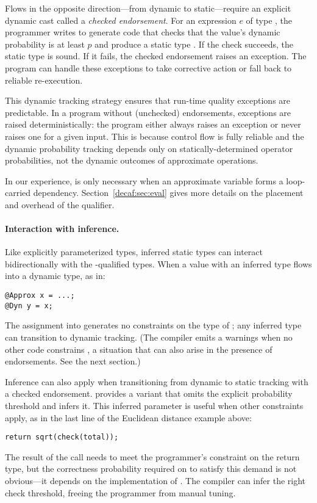 {Flows in the opposite direction---from dynamic to static---require an explicit
dynamic cast called a \emph{checked endorsement}.
For an expression $e$ of type , the programmer writes
 to generate code that checks that the value's
dynamic probability is at least $p$ and produce a static type
.
If the check succeeds, the static type is sound.
If it fails, the checked endorsement raises an exception.
The program can handle these exceptions to take corrective action or fall back
to reliable re-execution.

This dynamic tracking strategy ensures that run-time quality exceptions are predictable.
In a program without (unchecked) endorsements, exceptions are raised
deterministically: the program either always raises an exception or never
raises one for a given input.
This is because control flow is fully reliable and the dynamic probability
tracking depends only on statically-determined operator probabilities, not the
dynamic outcomes of approximate operations.

In our experience,  is only necessary when an approximate variable
forms a loop-carried dependency.
Section~\ref{decaf:sec:eval} gives more details on the placement and overhead of the
 qualifier.

\paragraph{Interaction with inference.}
Like explicitly parameterized types, inferred static types can interact bidirectionally
with the -qualified types.
When a value with an inferred type flows into a dynamic type, as in:
%
\begin{lstlisting}
@Approx x = ...;
@Dyn y = x;
\end{lstlisting}
%
The assignment into  generates no constraints on the type of ;
any inferred type can transition to dynamic tracking.
(The compiler emits a warnings when no other code constrains
, a situation that can also arise in the presence of endorsements. See
the next section.)

Inference can also apply when transitioning from dynamic to static tracking
with a checked endorsement.
\lang provides a  variant that omits the explicit probability
threshold and infers it.
This inferred parameter is useful when other constraints apply, as in the
last line of the Euclidean distance example above:
%
\begin{lstlisting}
return sqrt(check(total));
\end{lstlisting}
%
The result of the  call needs to meet the programmer's
 constraint on the return type, but the correctness
probability required on  to satisfy this demand is not
obvious---it depends on the implementation of .
The compiler can infer the right check threshold, freeing the programmer from
manual tuning.

}
